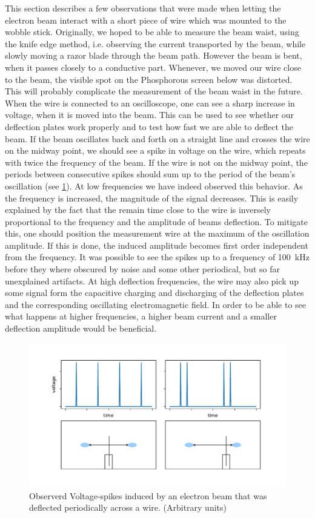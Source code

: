 This section describes a few observations that were made when letting the electron beam interact with a short piece of wire which was mounted to the wobble stick. Originally, we hoped to be able to measure the beam waist, using the knife edge method, i.e. observing the current transported by the beam, while slowly moving a razor blade through the beam path. However the beam is bent, when it passes closely to a conductive part. Whenever, we moved our wire close to the beam, the visible spot on the Phosphorous screen below was distorted. This will probably complicate the measurement of the beam waist in the future. 
When the wire is connected to an oscilloscope, one can see a sharp increase in voltage, when it is moved into the beam. This can be used to see whether our deflection plates work properly and to test how fast we are able to deflect the beam. If the beam oscillates back and forth on a straight line and crosses the wire on the midway point, we should see a spike in voltage on the wire, which repeats with twice the frequency of the beam. If the wire is not on the midway point, the periods between consecutive spikes should sum up to the period of the beam's oscillation (see \cref{fig:spikes}). At low frequencies we have indeed observed this behavior. As the frequency is increased, the magnitude of the signal decreases. This is easily explained by the fact that the remain time close to the wire is inversely proportional to the frequency and the amplitude of beams deflection. To mitigate this, one should position the measurement wire at the maximum of the oscillation amplitude. If this is done, the induced amplitude becomes first order independent from the frequency. It was possible to see the spikes up to a frequency of \SI{100}{\kilo\hertz} before they where obscured by noise and some other periodical, but so far unexplained artifacts.
At high deflection frequencies, the wire may also pick up some signal form the capacitive charging and discharging of the deflection plates and the corresponding oscillating electromagnetic field.
In order to be able to see what happens at higher frequencies, a higher beam current and a smaller deflection amplitude would be beneficial.

\begin{figure}
	\centering
	\includegraphics[width=0.8\linewidth]{Chapters/beam-characterization/Spikes}
	\caption{Observerd Voltage-spikes induced by an electron beam that was deflected periodically across a wire. (Arbitrary units)}
	\label{fig:spikes}
\end{figure}

